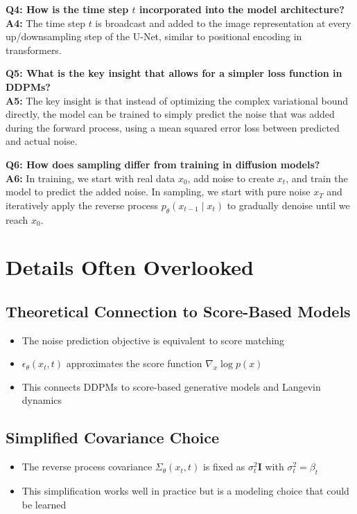 \vspace{1em}
\textbf{Q4: How is the time step $t$ incorporated into the model architecture?}\\
\textbf{A4:} The time step $t$ is broadcast and added to the image representation at every up/downsampling step of the U-Net, similar to positional encoding in transformers.

\vspace{1em}
\textbf{Q5: What is the key insight that allows for a simpler loss function in DDPMs?}\\
\textbf{A5:} The key insight is that instead of optimizing the complex variational bound directly, the model can be trained to simply predict the noise that was added during the forward process, using a mean squared error loss between predicted and actual noise.

\vspace{1em}
\textbf{Q6: How does sampling differ from training in diffusion models?}\\
\textbf{A6:} In training, we start with real data $x_0$, add noise to create $x_t$, and train the model to predict the added noise. In sampling, we start with pure noise $x_T$ and iteratively apply the reverse process $p_\theta(x_{t-1} \mid x_t)$ to gradually denoise until we reach $x_0$.

\section{Details Often Overlooked}

\subsection*{Theoretical Connection to Score-Based Models}
\begin{itemize}
    \item The noise prediction objective is equivalent to score matching
    \item $\epsilon_\theta(x_t, t)$ approximates the score function $\nabla_x \log p(x)$
    \item This connects DDPMs to score-based generative models and Langevin dynamics
\end{itemize}

\subsection*{Simplified Covariance Choice}
\begin{itemize}
    \item The reverse process covariance $\Sigma_\theta(x_t, t)$ is fixed as $\sigma_t^2 \mathbf{I}$ with $\sigma_t^2 = \beta_t$
    \item This simplification works well in practice but is a modeling choice that could be learned
\end{itemize}

